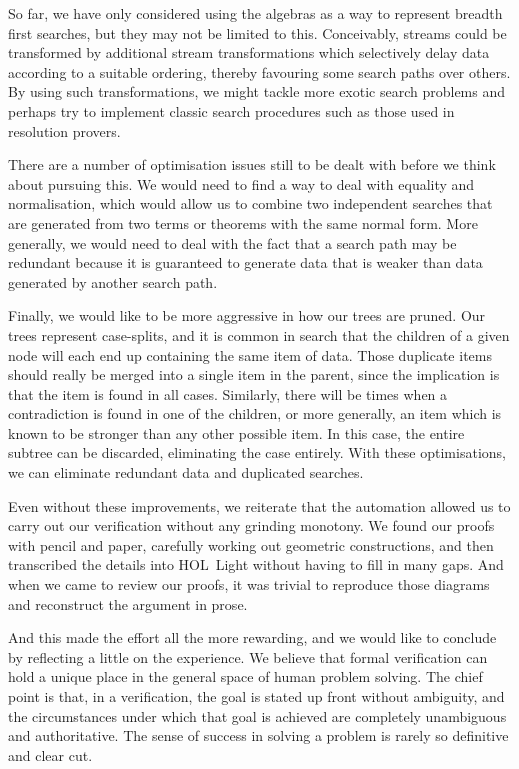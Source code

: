 So far, we have only considered using the algebras as a way to represent breadth first searches, but they may not be limited to this. Conceivably, streams could be transformed by additional stream transformations which selectively delay data according to a suitable ordering, thereby favouring some search paths over others. By using such transformations, we might tackle more exotic search problems and perhaps try to implement classic search procedures such as those used in resolution provers.

There are a number of optimisation issues still to be dealt with before we think about pursuing this. We would need to find a way to deal with equality and normalisation, which would allow us to combine two independent searches that are generated from two terms or theorems with the same normal form. More generally, we would need to deal with the fact that a search path may be redundant because it is guaranteed to generate data that is weaker than data generated by another search path.

Finally, we would like to be more aggressive in how our trees are pruned. Our trees represent case-splits, and it is common in search that the children of a given node will each end up containing the same item of data. Those duplicate items should really be merged into a single item in the parent, since the implication is that the item is found in all cases. Similarly, there will be times when a contradiction is found in one of the children, or more generally, an item which is known to be stronger than any other possible item. In this case, the entire subtree can be discarded, eliminating the case entirely. With these optimisations, we can eliminate redundant data and duplicated searches.

Even without these improvements, we reiterate that the automation allowed us to carry out our verification without any grinding monotony. We found our proofs with pencil and paper, carefully working out geometric constructions, and then transcribed the details into HOL~Light without having to fill in many gaps. And when we came to review our proofs, it was trivial to reproduce those diagrams and reconstruct the argument in prose.

And this made the effort all the more rewarding, and we would like to conclude by reflecting a little on the experience. We believe that formal verification can hold a unique place in the general space of human problem solving. The chief point is that, in a verification, the goal is stated up front without ambiguity, and the circumstances under which that goal is achieved are completely unambiguous and authoritative. The sense of success in solving a problem is rarely so definitive and clear cut.

